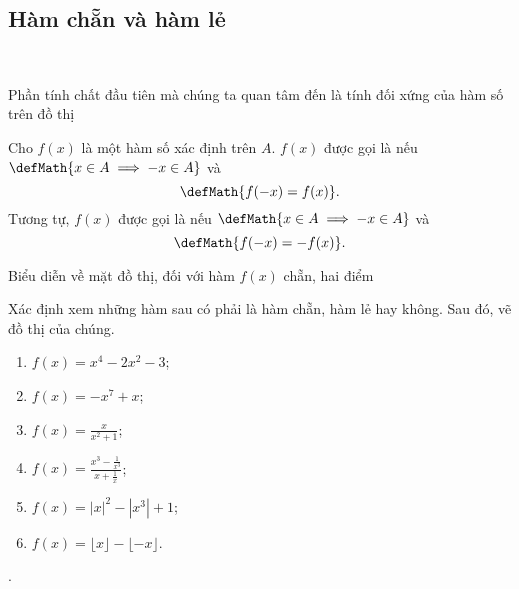 \subsection{Hàm chẵn và hàm lẻ}

\ %

Phần tính chất đầu tiên mà chúng ta quan tâm đến là tính đối xứng của hàm số trên đồ thị

Cho $f(x)$ là một hàm số xác định trên $A$. $f(x)$ được gọi là  nếu $\defMath{x \in A \implies -x \in A}$ và $$\defMath{f(-x) = f(x)}.$$ Tương tự, $f(x)$ được gọi là  nếu $\defMath{x \in A \implies -x \in A}$ và $$\defMath{f(-x) = -f(x)}.$$

Biểu diễn về mặt đồ thị, đối với hàm $f(x)$ chẵn, hai điểm 

\exercise Xác định xem những hàm sau có phải là hàm chẵn, hàm lẻ hay không. Sau đó, vẽ đồ thị của chúng.
\begin{multicols}{2}
   \begin{enumerate}
      \item $f(x) = x^4 - 2x^2 - 3$;
      \item $f(x) = -x^7 + x$;
      \item $f(x) = \frac{x}{x^2 + 1}$;
      \item $f(x) = \frac{x^3 - \frac{1}{x^3}}{x + \frac{1}{x}}$;
      \item $f(x) = |x|^2 - \left|x^3\right| + 1$;
      \item $f(x) = \lfloor x \rfloor - \lfloor -x \rfloor$.
   \end{enumerate}
\end{multicols}

\solution 

\setcounter{subexercise}{1}
. 